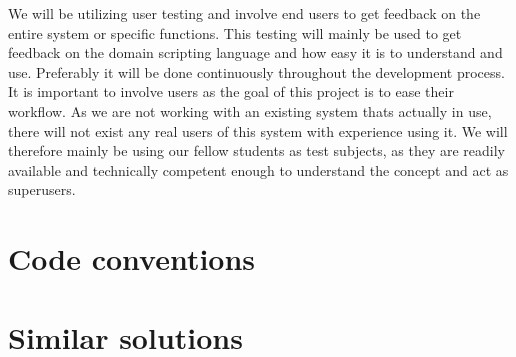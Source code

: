 We will be utilizing user testing and involve end users to get feedback on the entire system or specific functions. This testing will mainly be used to get feedback on the domain scripting language and how easy it is to understand and use. Preferably it will be done continuously throughout the development process. It is important to involve users as the goal of this project is to ease their workflow. As we are not working with an existing system thats actually in use, there will not exist any real users of this system with experience using it. We will therefore mainly be using our fellow students as test subjects, as they are readily available and technically competent enough to understand the concept and act as superusers.

\section{Code conventions}
\section{Similar solutions}
